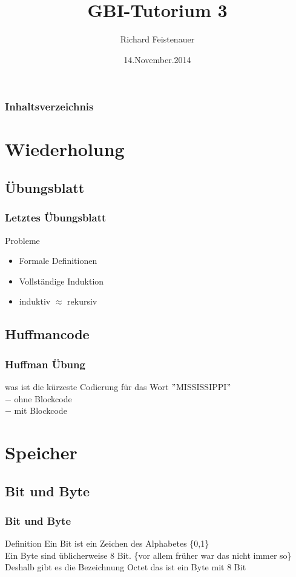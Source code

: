 \documentclass{beamer}
\author{Richard Feistenauer}
\title{GBI-Tutorium 3}
\date{14.November.2014}
\begin{document}
\begin{frame}
	\titlepage
\end{frame}

\begin{frame}
	\frametitle {Inhaltsverzeichnis}
	\tableofcontents
\end{frame}

\section{Wiederholung}
\subsection{Übungsblatt}
\begin{frame}
	\frametitle{Letztes \"Ubungsblatt}
	\begin{block}{Probleme}
		\begin{itemize}
			\item Formale Definitionen
			\item Vollständige Induktion
			\item induktiv $\approx$ rekursiv
		\end{itemize}
	\end{block}
\end{frame}

\subsection{Huffmancode}
\begin{frame}
	\frametitle{Huffman \"Ubung}
	\begin{block}{}
		was ist die kürzeste Codierung für das Wort $"$MISSISSIPPI$"$ \\
		$-$ ohne Blockcode\\
		$-$ mit Blockcode	
	\end{block}
\end{frame}

\section{Speicher}
\subsection{Bit und Byte}
\begin{frame}
	\frametitle{Bit und Byte}
	\begin{block}{Definition}
		Ein Bit ist ein Zeichen des Alphabetes \{0,1\}\\
		Ein Byte sind üblicherweise 8 Bit. \{vor allem früher war das 		nicht immer so\} \\
		Deshalb gibt es die Bezeichnung Octet das ist ein Byte mit 8 			Bit
	\end{block}
\end{frame}
\end{document}
